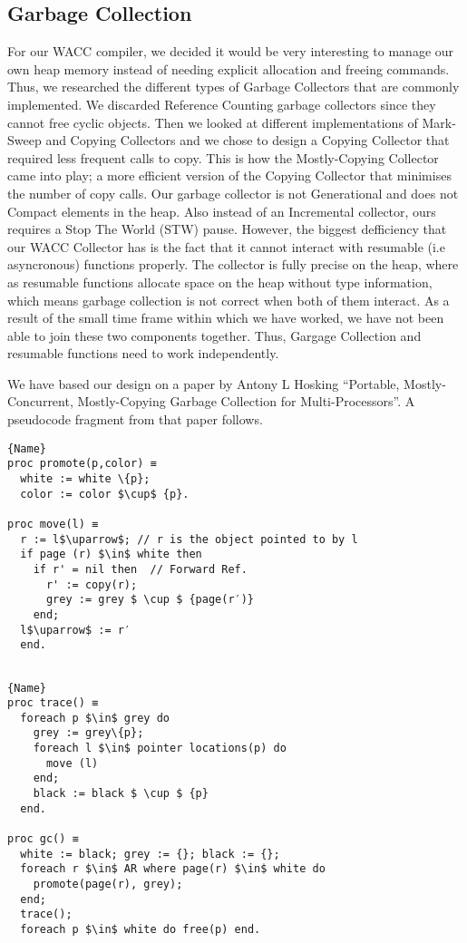 \documentclass{article}
\begin{document}
\subsection{Garbage Collection}
For our WACC compiler, we decided it would be very interesting to manage our own heap memory instead of needing explicit allocation and freeing commands. Thus, we researched the different types of Garbage Collectors that
are commonly implemented. We discarded Reference Counting garbage collectors since they cannot free cyclic objects. Then we looked at different implementations of Mark-Sweep and Copying Collectors and we chose to design a Copying Collector that required less frequent calls to copy. This is how the Mostly-Copying Collector came into play; a more efficient version of the Copying Collector that minimises the number of copy calls. Our garbage collector is not Generational and does not Compact elements in the heap. Also instead of an Incremental collector, ours requires a Stop The World (STW) pause. However, the biggest defficiency that our WACC Collector has is the fact that it cannot interact with resumable (i.e asyncronous) functions properly. The collector is fully precise on the heap, where as resumable functions allocate space on the heap without type information, which means garbage collection is not correct when both of them interact. As a result of the small time frame within which we have worked, we have not been able to join these two components together. Thus, Gargage Collection and resumable functions need to work independently. 



We have based our design on a paper by Antony L Hosking ``Portable, Mostly-Concurrent, Mostly-Copying Garbage Collection for Multi-Processors''. A pseudocode fragment from that paper follows. 

\noindent\begin{minipage}{.46\textwidth}
\begin{lstlisting}[frame=tlrb, mathescape]{Name}
proc promote(p,color) ≡ 
  white := white \{p}; 
  color := color $\cup$ {p}.

proc move(l) ≡ 
  r := l$\uparrow$; // r is the object pointed to by l
  if page (r) $\in$ white then 
    if r' = nil then  // Forward Ref. 
      r' := copy(r);
      grey := grey $ \cup $ {page(r′)}
    end;
  l$\uparrow$ := r′
  end.


\end{lstlisting}
\end{minipage}\hfill
\begin{minipage}{.45\textwidth}
\begin{lstlisting}[frame=tlrb, mathescape]{Name}
proc trace() ≡ 
  foreach p $\in$ grey do
    grey := grey\{p};
    foreach l $\in$ pointer locations(p) do
      move (l)
    end;
    black := black $ \cup $ {p}
  end.

proc gc() ≡
  white := black; grey := {}; black := {}; 
  foreach r $\in$ AR where page(r) $\in$ white do
    promote(page(r), grey);
  end;
  trace();
  foreach p $\in$ white do free(p) end.
\end{lstlisting}
\end{minipage}
\end{document}
